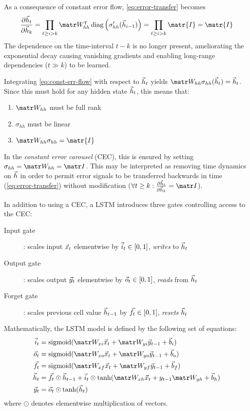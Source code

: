 As a consequence of constant error flow, \vref{eq:error-transfer} becomes
\begin{equation}
  \frac{\pd \h_t}{\pd \h_k}
  = \prod_{t \geq i > k} \W_{hh}^\tp \diag \left( \sigma_{hh}'( \h_{i-1} ) \right)
  = \prod_{t \geq i > k} \matr{I}
  = \matr{I}
\end{equation}
The dependence on the time-interval $t-k$ is no longer present, ameliorating
the exponential decay causing vanishing gradients and enabling long-range
dependencies (\ie $t \gg k$) to be learned.

Integrating \cref{eq:const-err-flow} with respect to $\vec{h}_t$ yields $\W_{hh}
\sigma_{hh}(\h_{t}) = \h_{t}$. Since this must hold for any hidden state
$\vec{h}_{t}$, this means that:
\begin{enumerate}
    \item $\W_{hh}$ must be full rank
    \item $\sigma_{hh}$ must be linear
    \item $\W_{hh} \sigma_{hh} = \matr{I}$
\end{enumerate}

In the \emph{constant error carousel} (CEC), this is ensured by setting
$\sigma_{hh} = \W_{hh} = \I$. This may be interpreted as removing time dynamics
on $\vec{h}$ in order to permit error signals to be transferred backwards in time
(\cref{eq:error-transfer}) without modification (\ie $\forall t \geq k: \frac{\pd
\h_t}{\pd \h_k} = \I$).

In addition to using a CEC, a LSTM introduces three gates controlling access to the CEC:
\begin{description}
  \item[Input gate]: scales input $\vec{x}_t$ elementwise by $\vec{i}_t \in [0,1]$, \emph{writes} to $\vec{h}_t$
  \item[Output gate]: scales output $\vec{y}_t$ elementwise by $\vec{o}_t \in [0,1]$, \emph{reads} from $\vec{h}_t$
  \item[Forget gate]: scales previous cell value $\vec{h}_{t-1}$ by $\vec{f}_t \in [0,1]$, \emph{resets} $\vec{h}_t$
\end{description}

Mathematically, the LSTM model is defined by the following set of equations:
\begin{align}
    \i_t &= \sigmoid(\W_{xi} \x_t + \W_{yi} \y_{t-1} + \b_i) \\
    \o_t &= \sigmoid(\W_{xo} \x_t + \W_{yo} \y_{t-1} + \b_o) \\
    \f_t &= \sigmoid(\W_{xf} \x_t + \W_{yf} \y_{t-1} + \b_f) \\
    \h_t &= \f_t \odot \h_{t-1} + \i_t \odot \tanh(\W_{xh}\x_t + y_{t-1} \W_{yh} + \b_h) \\
    \y_t &= \o_t \odot \tanh(\h_t)
\end{align}
where $\odot$ denotes elementwise multiplication of vectors.

